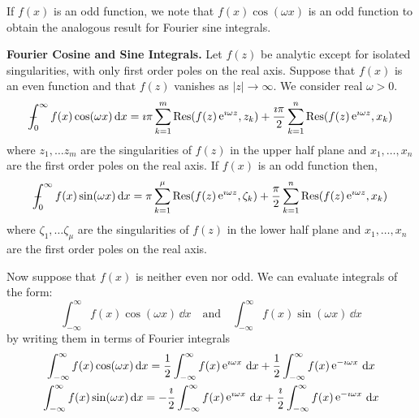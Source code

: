If $f(x)$ is an odd function, we note that $f(x) \cos( \omega x )$ is an odd
function to obtain the analogous result for Fourier sine integrals.







\begin{Result}
  \label{fourier_cos_sin_integrals}
  \textbf{Fourier Cosine and Sine Integrals.}
  Let $f(z)$ be analytic except for isolated singularities, with only 
  first order poles on the real axis.  Suppose that $f(x)$ is an even 
  function 
  and that $f(z)$ vanishes as $|z| \to \infty$.  We consider real $\omega > 0$. 
  \[
  - \negthickspace \negthickspace \negthickspace \negmedspace \int_0^\infty f(x) \cos (\omega x) \,\mathrm{d} x 
  = \imath \pi \sum_{k = 1}^m \mathop{\mathrm{Res}}\nolimits( f(z) \mathop{\mathrm{e}}\nolimits^{\imath \omega z}, z_k )
  + \frac{\imath \pi}{2} \sum_{k = 1}^n \mathop{\mathrm{Res}}\nolimits( f(z) \mathop{\mathrm{e}}\nolimits^{\imath \omega z}, x_k )
  \]
  where $z_1, \ldots z_m$ are the singularities of $f(z)$ in the upper half 
  plane and $x_1, \ldots, x_n$ are the first order poles on the real axis.  
  If $f(x)$ is an odd function then,
  \[
  - \negthickspace \negthickspace \negthickspace \negmedspace \int_0^\infty f(x) \sin (\omega x) \,\mathrm{d} x 
  = \pi \sum_{k = 1}^\mu \mathop{\mathrm{Res}}\nolimits( f(z) \mathop{\mathrm{e}}\nolimits^{\imath \omega z}, \zeta_k )
  + \frac{\pi}{2} \sum_{k = 1}^n \mathop{\mathrm{Res}}\nolimits( f(z) \mathop{\mathrm{e}}\nolimits^{\imath \omega z}, x_k )
  \]
  where $\zeta_1, \ldots \zeta_\mu$ are the singularities of $f(z)$ in the lower half 
  plane and $x_1, \ldots, x_n$ are the first order poles on the real axis.  
\end{Result}




Now suppose that $f(x)$ is neither even nor odd.
We can evaluate integrals of the form:
\[
\int_{-\infty}^\infty f(x) \cos (\omega x) \,\dd x \quad \mathrm{and} \quad
\int_{-\infty}^\infty f(x) \sin (\omega x) \,\dd x
\]
by writing them in terms of Fourier integrals
\begin{gather*}
  \int_{-\infty}^\infty f(x) \cos (\omega x) \,\mathrm{d} x
  = \frac{1}{2} \int_{-\infty}^\infty f(x) \mathop{\mathrm{e}}\nolimits^{\imath \omega x} \,\mathrm{d} x
  + \frac{1}{2} \int_{-\infty}^\infty f(x) \mathop{\mathrm{e}}\nolimits^{- \imath \omega x} \,\mathrm{d} x \\
  \int_{-\infty}^\infty f(x) \sin (\omega x) \,\mathrm{d} x
  = - \frac{\imath}{2} \int_{-\infty}^\infty f(x) \mathop{\mathrm{e}}\nolimits^{\imath \omega x} \,\mathrm{d} x
  + \frac{\imath}{2} \int_{-\infty}^\infty f(x) \mathop{\mathrm{e}}\nolimits^{- \imath \omega x} \,\mathrm{d} x 
\end{gather*}












